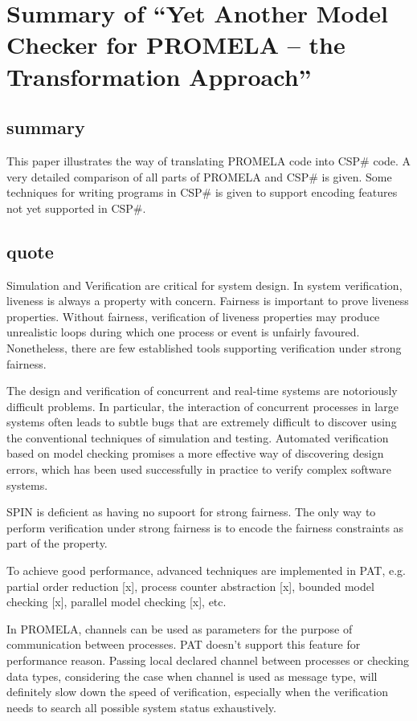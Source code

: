 \documentclass{llncs}
\newcommand{\csps}{CSP\#}
\begin{document}
\section{Summary of ``Yet Another Model Checker for PROMELA -- the
Transformation Approach''\cite{Zhao2010Yet}} 
  \label{section:yet_csp_promela}
\subsection{summary}
This paper illustrates the way of translating PROMELA code into \csps{} code. A
very detailed comparison of all parts of PROMELA and \csps{} is given. Some
techniques for writing programs in \csps{} is given to support encoding features
not yet supported in \csps{}.

\subsection{quote}
Simulation and Verification are critical for system
design. In system verification, liveness is always a property
with concern. Fairness is important to prove liveness
properties. Without fairness, verification of liveness
properties may produce unrealistic loops during which one
process or event is unfairly favoured. Nonetheless, there are
few established tools supporting verification under strong
fairness.

The design and verification of concurrent and real-time
systems are notoriously difficult problems. In particular, the
interaction of concurrent processes in large systems often
leads to subtle bugs that are extremely difficult to discover
using the conventional techniques of simulation and testing.
Automated verification based on model checking promises a
more effective way of discovering design errors, which has
been used successfully in practice to verify complex software
systems.

SPIN is deficient as having no supoort for strong fairness. The only way to
perform verification under strong fairness is to encode the fairness constraints
as part of the property.

To achieve good performance, advanced techniques are
implemented in PAT, e.g. partial order reduction [x], process
counter abstraction [x], bounded model checking [x], parallel
model checking [x], etc.

In PROMELA, channels can be used as parameters for the
purpose of communication between processes.
PAT doesn’t support this feature for performance reason.
Passing local declared channel between processes or
checking data types, considering the case when channel is
used as message type, will definitely slow down the speed of
verification, especially when the verification needs to search
all possible system status exhaustively.
\end{document}
